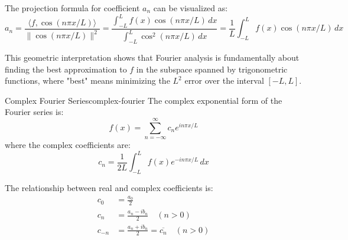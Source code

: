 The projection formula for coefficient \(a_n\) can be visualized as:
\begin{equation}
    a_n = \frac{\langle f, \cos(n\pi x/L) \rangle}{\|\cos(n\pi x/L)\|^2} = \frac{\int_{-L}^{L} f(x)\cos(n\pi x/L)\,dx}{\int_{-L}^{L} \cos^2(n\pi x/L)\,dx} = \frac{1}{L}\int_{-L}^{L} f(x)\cos(n\pi x/L)\,dx
\end{equation}

This geometric interpretation shows that Fourier analysis is fundamentally about finding the best approximation to \(f\) in the subspace spanned by trigonometric functions, where "best" means minimizing the \(L^2\) error over the interval \([-L,L]\).

\begin{definition}{Complex Fourier Series}{complex-fourier}
    The complex exponential form of the Fourier series is:
    \begin{equation}
        f(x) = \sum_{n=-\infty}^{\infty} c_n e^{i n \pi x / L}
    \end{equation}
    where the complex coefficients are:
    \begin{equation}
        c_n = \frac{1}{2L} \int_{-L}^{L} f(x) e^{-i n \pi x / L} \, dx
    \end{equation}

    The relationship between real and complex coefficients is:
    \begin{align}
        c_0    & = \frac{a_0}{2}                                        \\
        c_n    & = \frac{a_n - i b_n}{2} \quad (n > 0)                  \\
        c_{-n} & = \frac{a_n + i b_n}{2} = \overline{c_n} \quad (n > 0)
    \end{align}
\end{definition}

